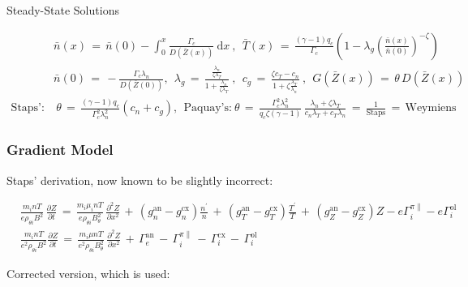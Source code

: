 \documentclass[a4paper,8pt]{article}
\begin{document}
\normalsize

Steady-State Solutions \small

\begin{align}
    &\bar{n}(x) \,=\, \bar{n}(0) - \int_0^x \frac{\Gamma_c}{D(\bar{Z}(x))}~\text{d}x~,
        ~~ \bar{T}(x) \,=\, \frac{(\gamma - 1) q_c}{\Gamma_c} \left(1 - \lambda_g\left(\frac{\bar{n}(x)}{\bar{n}(0)}\right)^{-\zeta}\right) \\
    &\bar{n}(0) \,=\, -\frac{\Gamma_c \lambda_n}{D(\bar{Z}(0))},
        ~~ \lambda_g \,=\, \frac{\frac{\lambda_n}{\zeta \lambda_T}}{1 + \frac{\lambda_n}{\zeta \lambda_T}}~,
        ~~ c_g \,=\, \frac{\zeta c_T - c_n}{1 + \zeta \frac{\lambda_T}{\lambda_n}}~, ~~ G(\bar{Z}(x)) \,=\, \theta\,D(\bar{Z}(x)) \\
    \text{Staps':}& ~ \theta \,=\, \frac{(\gamma - 1) q_c}{\Gamma_c^2 \lambda_n^2} (c_n + c_g), ~~ \text{Paquay's:} ~ \theta \,=\, \frac{\Gamma_c^2 \lambda_n^2}{q_c \zeta (\gamma - 1)} \, \frac{\lambda_n + \zeta\lambda_T}{c_n\lambda_T + c_T\lambda_n} \,=\, \frac{1}{\text{Staps}} \,=\, \text{Weymiens}
\end{align}

\normalsize

\subsubsection{Gradient Model}\label{gradient-model}

Staps' derivation, now known to be slightly incorrect: \small

\begin{align}
    &\frac{m_i n T}{e \rho_{\theta i} B^2} \, \frac{\partial Z}{\partial t}
        \,=\, \frac{m_i \mu_i n T}{e \rho_{\theta i} B_\theta^2} \,
        \frac{\partial^2 Z}{\partial x^2} \,+\, \left(g_n^\text{an} -
        g_n^\text{cx}\right) \frac{n^\prime}{n} \,+\, \left(g_T^\text{an} -
        g_T^\text{cx}\right) \frac{T^\prime}{T} \,+\, \left(g_Z^\text{an} -
        g_Z^\text{cx}\right) Z - e\Gamma_i^{\pi\parallel} - e\Gamma_i^\text{ol} \\
    &\frac{m_i n T}{e^2 \rho_{\theta i} B^2} \frac{\partial Z}{\partial t}
        \,=\, \frac{m_i \mu n T}{e^2 \rho_{\theta i} B_\theta^2} \, 
        \frac{\partial^2 Z}{\partial x^2} \,+\, \Gamma_e^\text{an} \,-\,
        \Gamma_i^{\pi\parallel} \,-\, \Gamma_i^\text{cx} \,-\,
        \Gamma_i^\text{ol}
\end{align}

\normalsize

Corrected version, which is used: \small
\end{document}
